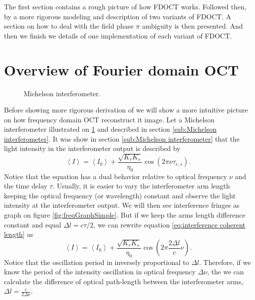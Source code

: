 \documentclass[12pt,twoside,english]{book}
\renewcommand{\~}{\perispomeni}%
\numberwithin{equation}{section}
\numberwithin{figure}{section}
\begin{document}
The first section contains a rough picture of how \gls{FDOCT} works. Followed then, by a more rigorous modeling and description of two variants of \gls{FDOCT}. A section on how to deal with the field phase $\pi$ ambiguity is then presented. And then we finish we details of one implementation of each variant of \gls{FDOCT}.

\section{Overview of Fourier domain OCT}

%
\begin{figure}[h]
	\centering
	\caption{Michelson interferometer.}
	\label{fig:Michelson-interferometer-2}
\end{figure}


Before showing more rigorous derivation of we will show a more intuitive picture on how frequency domain OCT reconstruct it image. Let a Michelson interferometer illustrated on \ref{fig:Michelson-interferometer-2} and described in section \ref{sub:Michelson interferometer}. It was show in section \ref{sub:Michelson interferometer} that the light intensity in the interferometer output is described by
\begin{equation} \left\langle I\right\rangle =\left\langle I_{0}\right\rangle +\frac{\sqrt{K_{r}K_{s}}}{\eta_{0}}\cos\left(2\pi\nu\tau_{r,s}\right).\end{equation}
Notice that the equation has a dual behavior relative to optical frequency $\nu$ and the time delay $\tau$. Usually, it is easier to vary the interferometer arm length keeping the optical frequency (or wavelength) constant and observe the light intensity at the interferometer output. We will then see interference fringes as graph on figure \ref{fig:freqGraphSimple}. But if we keep the arms length difference constant and equal $\Delta l=c\tau/2$, we can rewrite equation \ref{eq:interference coherent length} as
\begin{equation}
\left\langle I\right\rangle =\left\langle I_{0}\right\rangle +\frac{\sqrt{K_{r}K_{s}}}{\eta_{0}}\cos\left(2\pi\frac{2\Delta l}{c}\nu\right).\end{equation}
Notice that the oscillation period in inversely proportional to $\Delta l$. Therefore, if we know the period of the intensity oscillation in optical frequency $\Delta\nu$, the we can calculate the difference of optical path-length between the interferometer arms, $\Delta l=\frac{c}{2\Delta\nu}$.
\end{document}

